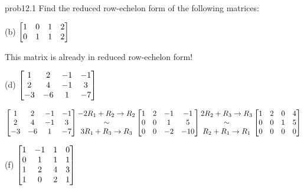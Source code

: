 



\begin{sol}{prob12.1} Find the reduced row-echelon form of the following matrices:
\medskip

(b) 
$\bmatrix 1&0&1&2\cr 0&1&1&2\endbmatrix $ 

\soln This matrix is already in  reduced row-echelon form!
\medskip

(d) $\bmatrix 1&2&-1&-1\\2&4&-1&3\\ -3&-6&1&-7\endbmatrix$

\soln
$$\bmatrix 1&2&-1&-1\\2&4&-1&3\\ -3&-6&1&-7\endbmatrix\begin{matrix} -2R_1+R_2\to R_2 \\ \sim \\3R_1+R_3\to R_3 \end{matrix}\bmatrix 
1&2&-1&-1\\
0&0&1&5\\ 
0&0&-2&-10\endbmatrix\begin{matrix} 2R_2+R_3\to R_3 \\ \sim \\R_2+R_1\to R_1 \end{matrix}\bmatrix
1 & 2 & 0 & 4 \\
 0 & 0 & 1 & 5 \\
 0 & 0 & 0 & 0 \endbmatrix$$

\medskip
%

(f) $\bmatrix 
1 & -1 & 1 & 0 \\
 0 & 1 & 1 & 1 \\
 1 & 2 & 4 & 3 \\
 1 & 0 & 2 & 1\endbmatrix$


\end{sol}
